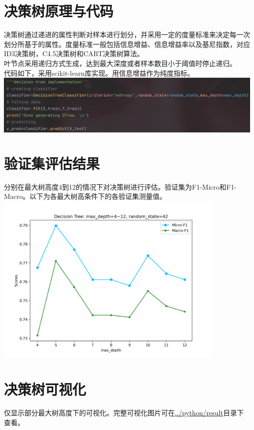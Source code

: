 \documentclass{article}
\begin{document}
\section{决策树原理与代码}
决策树通过递进的属性判断对样本进行划分，并采用一定的度量标准来决定每一次划分所基于的属性。度量标准一般包括信息增益、信息增益率以及基尼指数，对应ID3决策树，C4.5决策树和CART决策树算法。\\
叶节点采用递归方式生成，达到最大深度或者样本数目小于阈值时停止递归。\\
代码如下，采用scikit-learn库实现。用信息增益作为纯度指标。\\
\includegraphics[width=1.0\textwidth]{code_screenshot/DTreeMain.png}\\
\section{验证集评估结果}
分别在最大树高度4到12的情况下对决策树进行评估。验证集为F1-Micro和F1-Macro。以下为各最大树高条件下的各验证集测量值。\\
\includegraphics[width=0.85\textwidth]{../python/result/compare_4_to_12.png}\\
\section{决策树可视化}
仅显示部分最大树高度下的可视化。完整可视化图片可在\href{run:../python/result/}{../python/result}目录下查看。\\
\end{document}
